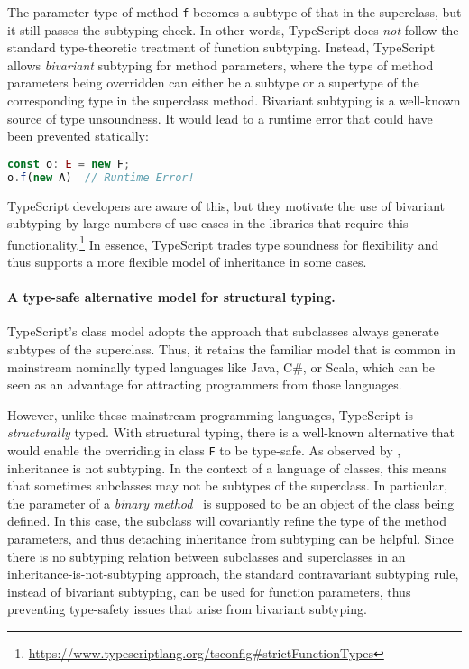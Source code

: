 \noindent
The parameter type of method \lstinline{f} becomes a subtype of that in the
superclass, but it still passes the subtyping check. In other words, TypeScript
does \emph{not} follow the standard type-theoretic treatment of function
subtyping. Instead, TypeScript allows \emph{bivariant} subtyping for method
parameters, where the type of method parameters being overridden can either be a
subtype or a supertype of the corresponding type in the superclass method.
Bivariant subtyping is a well-known source of type unsoundness. It would lead to
a runtime error that could have been prevented statically:
\begin{lstlisting}[language=TypeScript]
const o: E = new F;
o.f(new A)  // Runtime Error!
\end{lstlisting}
TypeScript developers are aware of this, but they motivate the use of bivariant
subtyping by large numbers of use cases in the libraries that require this
functionality.\footnote{\url{https://www.typescriptlang.org/tsconfig\#strictFunctionTypes}}
In essence, TypeScript trades type soundness for flexibility and thus supports a
more flexible model of inheritance in some cases.

\paragraph{A type-safe alternative model for structural typing.}
TypeScript's class model adopts the approach that subclasses always generate
subtypes of the superclass. Thus, it retains the familiar model that is common
in mainstream nominally typed languages like Java, C\#, or Scala, which can be
seen as an advantage for attracting programmers from those languages.

However, unlike these mainstream programming languages, TypeScript is
\emph{structurally} typed. With structural typing, there is a well-known
alternative that would enable the overriding in class \lstinline{F} to be
type-safe. As observed by \citet{cook1990inheritance}, inheritance is not
subtyping. In the context of a language of classes, this means that sometimes
subclasses may not be subtypes of the superclass. In particular, the parameter
of a \emph{binary method}~\citep{bruce1995binary} is supposed to be an object of
the class being defined. In this case, the subclass will covariantly refine the
type of the method parameters, and thus detaching inheritance from subtyping can
be helpful. Since there is no subtyping relation between subclasses and
superclasses in an inheritance-is-not-subtyping approach, the standard
contravariant subtyping rule, instead of bivariant subtyping, can be used for
function parameters, thus preventing type-safety issues that arise from
bivariant subtyping.

